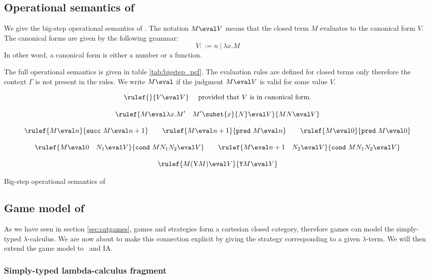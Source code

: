 \subsection{Operational semantics of \pcf}

We give the big-step operational semantics of \pcf. The notation $M \eval V$ means
that the closed term $M$ evaluates to the canonical form $V$. The canonical forms are given by the following
grammar:
$$V ::= n\ |\ \lambda x. M$$
In other word, a canonical form is either a number or a function.

The full operational semantics is given in table
\ref{tab:bigstep_pcf}. The evaluation rules are defined for closed
terms only therefore the context $\Gamma$ is not present in the
rules. We write $M \eval$ if the judgment $M \eval V$ is valid for some value $V$.

\begin{table}[htbp]
$$\rulef{}{V \eval V} \quad \mbox{ provided that $V$ is in canonical form.} $$

$$ \rulef{M \eval \lambda x. M' \quad M'\subst{x}{N} \eval V}{M N \eval V}$$

$$\rulef{M \eval n}{\texttt{succ}\ M \eval n+1}
\qquad \rulef{M \eval n+1}{\texttt{pred}\ M \eval n}
\qquad \rulef{M \eval 0}{\texttt{pred}\ M \eval 0}$$

$$\rulef{M \eval 0 \quad N_1 \eval V}{\texttt{cond}\ M N_1 N_2  \eval V}
\qquad
 \rulef{M \eval n+1 \quad N_2 \eval V}{\texttt{cond}\ M N_1 N_2  \eval V}$$

$$\rulef{M (\mathrm{Y} M) \eval V }{\texttt{Y} M \eval V}$$
\label{tab:bigstep_pcf}
\caption{Big-step operational semantics of \pcf}
\end{table}



\subsection{Game model of \pcf}
\label{subsec:pcfgamemodel}

As we have seen in section \ref{sec:catgames}, games and strategies
form a cartesian closed category, therefore games can model the
simply-typed $\lambda$-calculus. We are now about to make this
connection explicit by giving the strategy corresponding
to a given $\lambda$-term. We will then extend the game model to \pcf\ and IA.

\subsubsection{Simply-typed lambda-calculus fragment}

